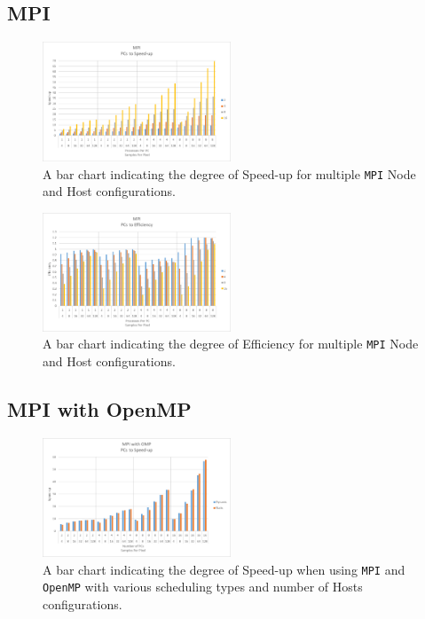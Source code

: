 \documentclass[journal,transmag]{IEEEtran}
\begin{document}
	\subsection{MPI}
		\begin{figure}[h]
			\centering
			\includegraphics[width = 0.5\textwidth]{chartMPISpeed}
			\caption{A bar chart indicating the degree of Speed-up for multiple \texttt{MPI} Node and Host configurations.}
			\label{fig_mpi_speed}
		\end{figure}
		
		\begin{figure}[h]
			\centering
			\includegraphics[width = 0.5\textwidth]{chartMPIEff}
			\caption{A bar chart indicating the degree of Efficiency for multiple \texttt{MPI} Node and Host configurations.}
			\label{fig_mpi_eff}
		\end{figure}
		\newpage
	\subsection{MPI with OpenMP}
		\begin{figure}[h]
			\centering
			\includegraphics[width = 0.5\textwidth]{chartOMPISpeed}
			\caption{A bar chart indicating the degree of Speed-up when using \texttt{MPI} and \texttt{OpenMP} with various scheduling types and number of Hosts configurations.}
			\label{fig_ompi_speed}
		\end{figure}
		
\end{document}
